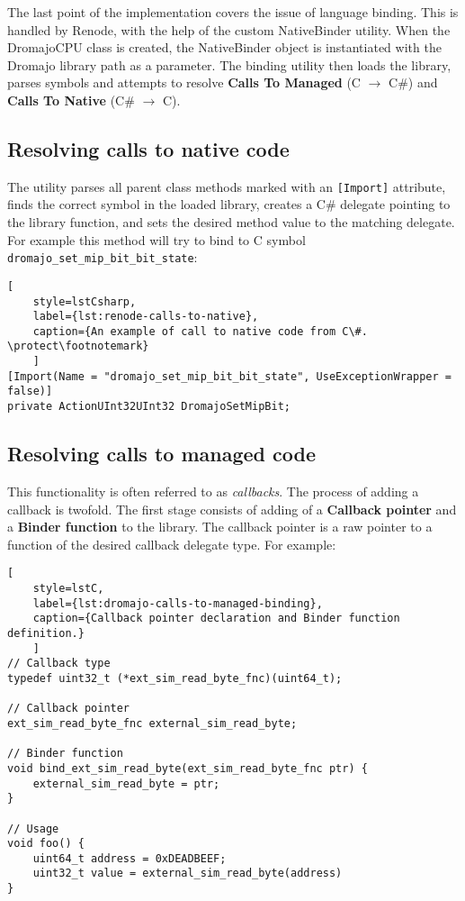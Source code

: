 The last point of the implementation covers the issue of language binding. This is handled by Renode, with the help
of the custom NativeBinder utility. When the DromajoCPU class is created, the NativeBinder object is instantiated with
the Dromajo library path as a parameter. The binding utility then loads the library, parses symbols and attempts to resolve
\textbf{Calls To Managed} (C $\rightarrow$ C\#) and \textbf{Calls To Native} (C\# $\rightarrow$ C).

\subsection*{Resolving calls to native code}

The utility parses all parent class methods marked with an \texttt{[Import]} attribute, finds the correct symbol in the
loaded library, creates a C\# delegate pointing to the library function, and sets the desired method value to the
matching delegate. For example this method will try to bind to C symbol \texttt{dromajo\_set\_mip\_bit\_bit\_state}:

\begin{lstlisting}[
    style=lstCsharp,
    label={lst:renode-calls-to-native},
    caption={An example of call to native code from C\#. \protect\footnotemark}
    ]
[Import(Name = "dromajo_set_mip_bit_bit_state", UseExceptionWrapper = false)]
private ActionUInt32UInt32 DromajoSetMipBit;
\end{lstlisting}


\subsection*{Resolving calls to managed code}

This functionality is often referred to as \textit{callbacks}. The process of adding a callback is twofold. The first stage
consists of adding of a \textbf{Callback pointer} and a \textbf{Binder function} to the library. The callback pointer
is a raw pointer to a function of the desired callback delegate type. For example:

\begin{lstlisting}[
    style=lstC,
    label={lst:dromajo-calls-to-managed-binding},
    caption={Callback pointer declaration and Binder function definition.}
    ]
// Callback type
typedef uint32_t (*ext_sim_read_byte_fnc)(uint64_t);

// Callback pointer
ext_sim_read_byte_fnc external_sim_read_byte;

// Binder function
void bind_ext_sim_read_byte(ext_sim_read_byte_fnc ptr) {
    external_sim_read_byte = ptr;
}

// Usage
void foo() {
    uint64_t address = 0xDEADBEEF;
    uint32_t value = external_sim_read_byte(address)
}
\end{lstlisting}

